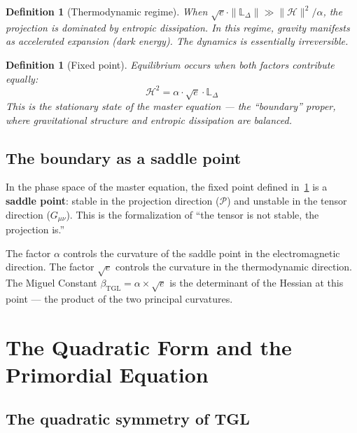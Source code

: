 \documentclass[12pt,a4paper,twoside]{article}
\newtheorem{definition}[theorem]{Definition}
\newcommand{\betatgl}{\beta_{\!\scriptscriptstyle\mathrm{TGL}}}
\begin{document}
\begin{definition}[Thermodynamic regime]
When $\sqrt{e} \cdot \|\mathbb{L}_\Delta\| \gg \|\mathcal{H}\|^2/\alpha$, the projection is dominated by entropic dissipation. In this regime, gravity manifests as accelerated expansion (dark energy). The dynamics is essentially irreversible.
\end{definition}

\begin{definition}[Fixed point]
\label{def:ponto_fixo}
Equilibrium occurs when both factors contribute equally:
\begin{equation}
\mathcal{H}^2 = \alpha \cdot \sqrt{e} \cdot \mathbb{L}_\Delta
\end{equation}
This is the stationary state of the master equation --- the ``boundary'' proper, where gravitational structure and entropic dissipation are balanced.
\end{definition}


\subsection{The boundary as a saddle point}

In the phase space of the master equation, the fixed point defined in~\ref{def:ponto_fixo} is a \textbf{saddle point}: stable in the projection direction ($\mathcal{P}$) and unstable in the tensor direction ($G_{\mu\nu}$). This is the formalization of ``the tensor is not stable, the projection is.''

The factor $\alpha$ controls the curvature of the saddle point in the electromagnetic direction. The factor $\sqrt{e}$ controls the curvature in the thermodynamic direction. The Miguel Constant $\betatgl = \alpha \times \sqrt{e}$ is the determinant of the Hessian at this point --- the product of the two principal curvatures.



\section{The Quadratic Form and the Primordial Equation}
\label{sec:quadratica}

\subsection{The quadratic symmetry of TGL}
\end{document}
